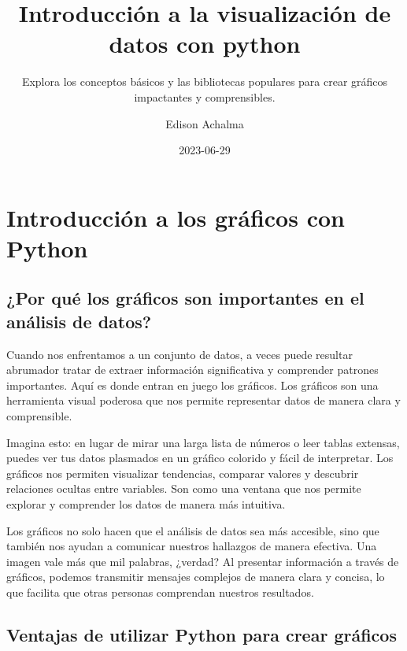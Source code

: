 \documentclass[
  a4paper,
]{article}
\title{Introducción a la visualización de datos con python}
\subtitle{Explora los conceptos básicos y las bibliotecas populares para
crear gráficos impactantes y comprensibles.}
\author{Edison Achalma}
\date{2023-06-29}
\begin{document}
\maketitle
\ifdefined\Shaded\renewenvironment{Shaded}{\begin{tcolorbox}[boxrule=0pt, frame hidden, breakable, enhanced, sharp corners, interior hidden, borderline west={3pt}{0pt}{shadecolor}]}{\end{tcolorbox}}\fi

\hypertarget{introducciuxf3n-a-los-gruxe1ficos-con-python}{%
\section{Introducción a los gráficos con
Python}\label{introducciuxf3n-a-los-gruxe1ficos-con-python}}

\hypertarget{por-quuxe9-los-gruxe1ficos-son-importantes-en-el-anuxe1lisis-de-datos}{%
\subsection{¿Por qué los gráficos son importantes en el análisis de
datos?}\label{por-quuxe9-los-gruxe1ficos-son-importantes-en-el-anuxe1lisis-de-datos}}

Cuando nos enfrentamos a un conjunto de datos, a veces puede resultar
abrumador tratar de extraer información significativa y comprender
patrones importantes. Aquí es donde entran en juego los gráficos. Los
gráficos son una herramienta visual poderosa que nos permite representar
datos de manera clara y comprensible.

Imagina esto: en lugar de mirar una larga lista de números o leer tablas
extensas, puedes ver tus datos plasmados en un gráfico colorido y fácil
de interpretar. Los gráficos nos permiten visualizar tendencias,
comparar valores y descubrir relaciones ocultas entre variables. Son
como una ventana que nos permite explorar y comprender los datos de
manera más intuitiva.

Los gráficos no solo hacen que el análisis de datos sea más accesible,
sino que también nos ayudan a comunicar nuestros hallazgos de manera
efectiva. Una imagen vale más que mil palabras, ¿verdad? Al presentar
información a través de gráficos, podemos transmitir mensajes complejos
de manera clara y concisa, lo que facilita que otras personas comprendan
nuestros resultados.

\hypertarget{ventajas-de-utilizar-python-para-crear-gruxe1ficos}{%
\subsection{Ventajas de utilizar Python para crear
gráficos}\label{ventajas-de-utilizar-python-para-crear-gruxe1ficos}}
\end{document}
